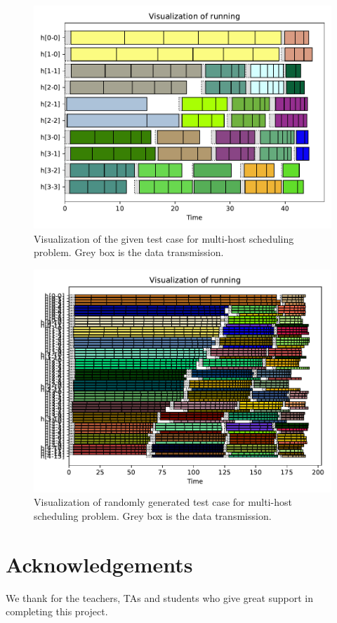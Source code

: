 \documentclass{llncs}
\begin{document}
\begin{figure}[t]
    \centering
    \includegraphics[width=0.9\linewidth]{task2.pdf}
    \caption{Visualization of the given test case for multi-host scheduling problem. Grey box is the data transmission.}
    \label{fig:task2}
\end{figure}

\begin{figure}[htbp]
    \centering
    \includegraphics[width=\textwidth]{task2_random_generate.pdf}
    \caption{Visualization of randomly generated test case for multi-host scheduling problem. Grey box is the data transmission.}
    \label{fig:task2_random}
\end{figure}


\section*{Acknowledgements}
We thank for the teachers, TAs and students who give great support in completing this project.
\end{document}
